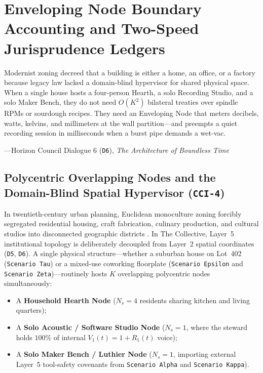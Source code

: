 \chapter{Enveloping Node Boundary Accounting and Two-Speed Jurisprudence Ledgers}
\label{ch:enveloping-node-boundary}

\epigraph{Modernist zoning decreed that a building is either a home, an office, or a factory because legacy law lacked a domain-blind hypervisor for shared physical space. When a single house hosts a four-person Hearth, a solo Recording Studio, and a solo Maker Bench, they do not need $O(K^2)$ bilateral treaties over spindle RPMs or sourdough recipes. They need an Enveloping Node that meters decibels, watts, kelvins, and millimeters at the wall partition---and preempts a quiet recording session in milliseconds when a burst pipe demands a wet-vac.}{---Horizon Council Dialogue 6 (\texttt{D6}), \textit{The Architecture of Boundless Time}}

\section{Polycentric Overlapping Nodes and the Domain-Blind Spatial Hypervisor (\texttt{CCI-4})}
\label{sec:ch8-enveloping-hypervisor}

In twentieth-century urban planning, Euclidean monoculture zoning forcibly segregated residential housing, craft fabrication, culinary production, and cultural studios into disconnected geographic districts \parencite{scott1998}. In The Collective, Layer~5 institutional topology is deliberately decoupled from Layer~2 spatial coordinates (\texttt{D5}, \texttt{D6}). A single physical structure---whether a suburban house on Lot~402 (\texttt{Scenario Tau}) or a mixed-use coworking floorplate (\texttt{Scenario Epsilon} and \texttt{Scenario Zeta})---routinely hosts $K$ overlapping polycentric nodes simultaneously:
\begin{itemize}
    \item A \textbf{Household Hearth Node} ($N_s = 4$ residents sharing kitchen and living quarters);
    \item A \textbf{Solo Acoustic / Software Studio Node} ($N_s = 1$, where the steward holds $100\%$ of internal $V_1(t) = 1 + R_1(t)$ voice);
    \item A \textbf{Solo Maker Bench / Luthier Node} ($N_s = 1$, importing external Layer~5 tool-safety covenants from \texttt{Scenario Alpha} and \texttt{Scenario Kappa}).
\end{itemize}

